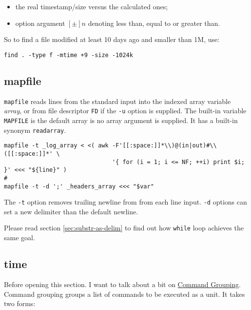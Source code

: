 \begin{itemize}
\item the real timestamp/size versus the calculated ones;
\item option argument $[\pm] n$ denoting less than, equal to or
  greater than.
\end{itemize}

So to find a file modified at least 10 days ago and smaller than
1M, use:

\lstinline|find . -type f -mtime +9 -size -1024k|

\subsection{mapfile}
\label{sec:bash-mapfile}

\lstinline|mapfile| reads lines from the standard input into the
indexed array variable \textit{array}, or from file descriptor
\lstinline|FD| if the \lstinline|-u| option is supplied.  The
built-in variable \lstinline|MAPFILE| is the default array is no
array argument is supplied. It has a built-in synonym
\lstinline|readarray|.

\begin{minipage}{1.0\linewidth}
\begin{lstlisting}
mapfile -t _log_array < <( awk -F'[[:space:]]*\\)@(in|out)#\\([[:space:]]*' \
                               '{ for (i = 1; i <= NF; ++i) print $i; }' <<< "${line}" )
#
mapfile -t -d ';' _headers_array <<< "$var"
\end{lstlisting}
\end{minipage}

The \lstinline|-t| option removes trailing newline from from each
line input. \lstinline|-d| options can set a new delimiter than
the default newline.

Please read section \ref{sec:substr-as-delim} to find out how
\lstinline|while| loop achieves the same goal.

\subsection{time}
\label{sec:bash-time}

Before opening this section. I want to talk about a bit on
\href{https://www.gnu.org/software/bash/manual/bash.html#Compound-Commands}{Command
  Grouping}. Command grouping groups a list of commands to be
executed as a unit. It takes two forms:


